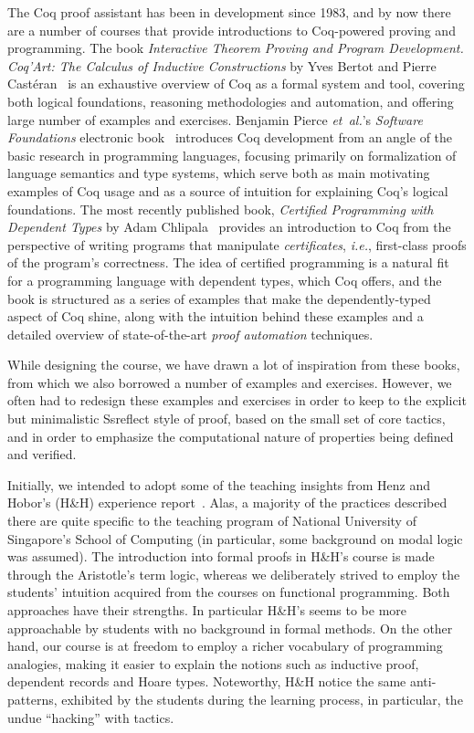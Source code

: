 \documentclass[blockstyle,preprint]{sigplanconf}
\newcommand{\ie}{\emph{i.e.}\xspace}
\newcommand{\etal}{\emph{et~al.}\xspace}
\begin{document}
The Coq proof assistant has been in development since 1983, and by now
there are a number of courses that provide introductions to
Coq-powered proving and programming.
%
The book \emph{Interactive Theorem Proving and Program
  Development. Coq'Art: The Calculus of Inductive Constructions} by
Yves Bertot and Pierre Cast\'{e}ran~\cite{Bertot-Casteran:BOOK} is an
exhaustive overview of Coq as a formal system and tool, covering both
logical foundations, reasoning methodologies and automation, and
offering large number of examples and exercises.
%
Benjamin Pierce \etal's \emph{Software Foundations} electronic
book~\cite{Pierce-al:SF} introduces Coq development from an angle of
the basic research in programming languages, focusing primarily on
formalization of language semantics and type systems, which serve both
as main motivating examples of Coq usage and as a source of intuition
for explaining Coq's logical foundations.
%
The most recently published book, \emph{Certified Programming with
  Dependent Types} by Adam Chlipala~\cite{Chlipala:BOOK} provides an
introduction to Coq from the perspective of writing programs that
manipulate \emph{certificates}, \ie, first-class proofs of the
program's correctness. The idea of certified programming is a natural
fit for a programming language with dependent types, which Coq offers,
and the book is structured as a series of examples that make the
dependently-typed aspect of Coq shine, along with the intuition behind
these examples and a detailed overview of state-of-the-art \emph{proof
  automation} techniques.

While designing the course, we have drawn a lot of inspiration from
these books, from which we also borrowed a number of examples and
exercises. However, we often had to redesign these examples and
exercises in order to keep to the explicit but minimalistic Ssreflect
style of proof, based on the small set of core tactics, and in order
to emphasize the computational nature of properties being defined and
verified.

Initially, we intended to adopt some of the teaching insights from
Henz and Hobor's (H\&H) experience
report~\cite{Henz-Hobor:CPP11}. Alas, a majority of the practices
described there are quite specific to the teaching program of National
University of Singapore's School of Computing (in particular, some
background on modal logic was assumed). The introduction into formal
proofs in H\&H's course is made through the Aristotle’s term logic,
whereas we deliberately strived to employ the students' intuition
acquired from the courses on functional programming. Both approaches
have their strengths. In particular H\&H's seems to be more
approachable by students with no background in formal methods. On the
other hand, our course is at freedom to employ a richer vocabulary of
programming analogies, making it easier to explain the notions such as
inductive proof, dependent records and Hoare types. Noteworthy, H\&H
notice the same anti-patterns, exhibited by the students during the
learning process, in particular, the undue ``hacking'' with tactics.
\end{document}
